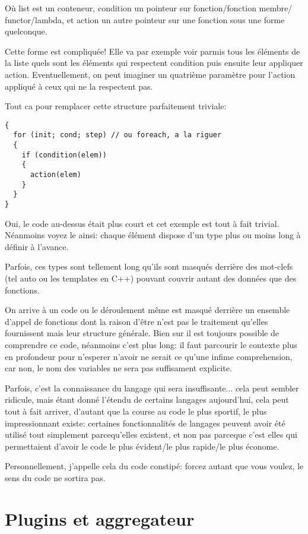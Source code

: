 \documentclass[a5paper, 12pt]{book}
\begin{document}
Où list est un conteneur, condition un pointeur sur fonction/fonction membre/
functor/lambda, et action un autre pointeur sur une fonction sous une forme
quelconque.

Cette forme est compliquée! Elle va par exemple voir parmis tous les éléments
de la liste quels sont les éléments qui respectent condition puis ensuite
leur appliquer action. Eventuellement, on peut imaginer un quatrième paramètre
pour l'action appliqué à ceux qui ne la respectent pas.

Tout ca pour remplacer cette structure parfaitement triviale:\\

\begin{verbatim}
{
  for (init; cond; step) // ou foreach, a la riguer
  {
    if (condition(elem))
    {
      action(elem)
    }
  }
}
\end{verbatim}

Oui, le code au-dessus était plus court et cet exemple est tout
à fait trivial. Néanmoins voyez le ainsi: chaque élément dispose
d'un type plus ou moins long à définir à l'avance.

Parfois, ces types sont tellement long qu'ils sont masqués derrière
des mot-clefs (tel auto ou les templates en C++) pouvant couvrir
autant des données que des fonctions.

On arrive à un code ou le déroulement même est masqué derrière
un ensemble d'appel de fonctions dont la raison d'être n'est
pas le traitement qu'elles fournissent mais leur structure générale.
Bien sur il est toujours possible de comprendre ce code, néanmoins
c'est plus long: il faut parcourir le contexte plus en profondeur
pour n'esperer n'avoir ne serait ce qu'une infime comprehension,
car non, le nom des variables ne sera pas suffisament explicite.

Parfois, c'est la connaissance du langage qui sera insuffisante...
cela peut sembler ridicule, mais étant donné l'étendu de certains
langages aujourd'hui, cela peut tout à fait arriver, d'autant
que la course au code le plus sportif, le plus impressionnant
existe: certaines fonctionnalités de langages peuvent avoir
été utilisé tout simplement parcequ'elles existent, et non pas
parceque c'est elles qui permettaient d'avoir le code le plus
évident/le plus rapide/le plus économe.

Personnellement, j'appelle cela du code constipé: forcez autant
que vous voulez, le sens du code ne sortira pas.

\chapter{Plugins et aggregateur}
\end{document}
